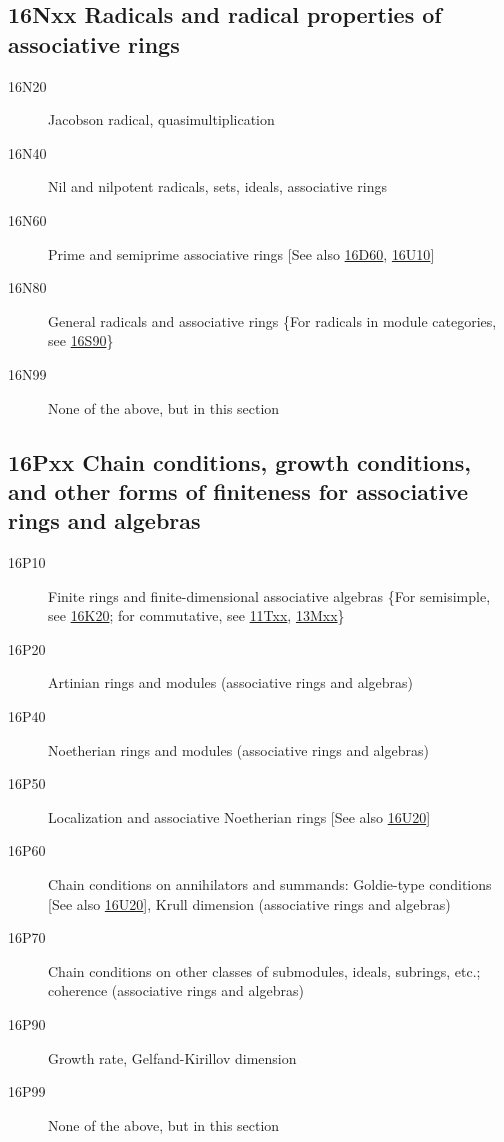 \documentclass[letterpaper]{article}
\begin{document}
\subsection*{16Nxx  Radicals and radical properties of associative rings }\label{16Nxx}
\begin{description}  
\item [16N20]\label{16N20} Jacobson radical, quasimultiplication
\item [16N40]\label{16N40} Nil and nilpotent radicals, sets, ideals, associative rings
\item [16N60]\label{16N60} Prime and semiprime associative rings [See also \hyperref[16D60]{16D60}, \hyperref[16U10]{16U10}]
\item [16N80]\label{16N80} General radicals and associative rings \{For radicals in module categories, see \hyperref[16S90]{16S90}\}
\item [16N99]\label{16N99} None of the above, but in this section
\end{description}
\subsection*{16Pxx  Chain conditions, growth conditions, and other forms of finiteness for associative rings and algebras}\label{16Pxx}
\begin{description}  
\item [16P10]\label{16P10} Finite rings and finite-dimensional associative algebras \{For semisimple, see \hyperref[16K20]{16K20}; for commutative, see \hyperref[11Txx]{11Txx}, \hyperref[13Mxx]{13Mxx}\}
\item [16P20]\label{16P20} Artinian rings and modules (associative rings and algebras)
\item [16P40]\label{16P40} Noetherian rings and modules (associative rings and algebras)
\item [16P50]\label{16P50} Localization and associative Noetherian rings [See also \hyperref[16U20]{16U20}]
\item [16P60]\label{16P60} Chain conditions on annihilators and summands: Goldie-type conditions [See also \hyperref[16U20]{16U20}], Krull dimension (associative rings and algebras)
\item [16P70]\label{16P70} Chain conditions on other classes of submodules, ideals, subrings, etc.; coherence (associative rings and algebras)
\item [16P90]\label{16P90} Growth rate, Gelfand-Kirillov dimension
\item [16P99]\label{16P99} None of the above, but in this section
\end{description}
\end{document}
